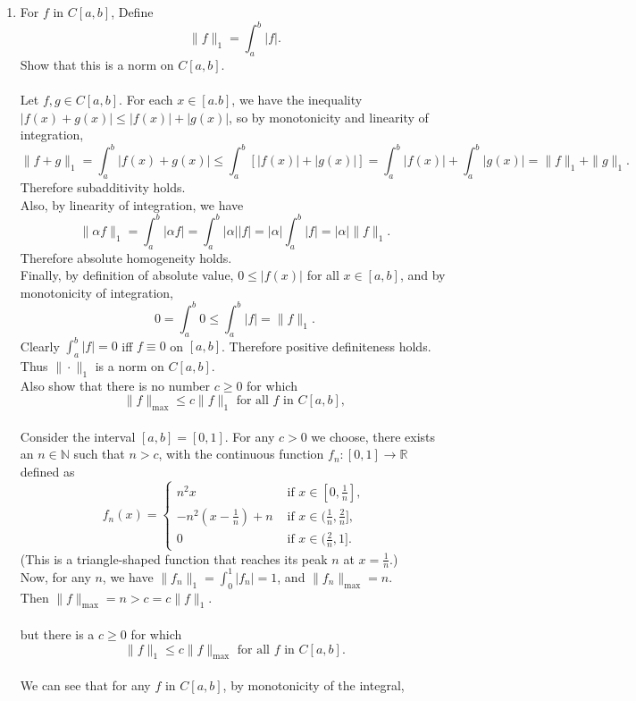 \begin{enumerate}
	\setcounter{enumi}{0}
	\item For $f$ in $C[a,b]$, Define
	\[
	\| f \|_1 = \int_a^b |f|.	
	\]
	Show that this is a norm on $C[a,b]$.\\\\
	Let $f,g\in C[a,b]$. For each $x\in [a.b]$, we have the inequality $|f(x)+g(x)|\le|f(x)|+|g(x)|$, so by monotonicity and linearity of integration,
	\[
	\|f+g\|_1=\int_a^b|f(x)+g(x)| \le \int_a^b[|f(x)|+|g(x)|] = \int_a^b|f(x)| +\int_a^b|g(x)| = \|f\|_1+\|g\|_1.	
	\]
	Therefore subadditivity holds.\\
	Also, by linearity of integration, we have
	\[
	\|\alpha f\|_1 = \int_a^b|\alpha f| = \int_a^b|\alpha| |f|=|\alpha|\int_a^b| f| = |\alpha|\|f\|_1.	
	\]
	Therefore absolute homogeneity holds.\\
	Finally, by definition of absolute value, $0 \le |f(x)|$ for all $x\in [a,b]$, and by monotonicity of integration,
	\[
	0=\int_a^b 0 \le \int_a^b |f| = \|f\|_1.	
	\] 
	Clearly $\int_a^b |f| = 0$ iff $f\equiv 0$ on $[a,b]$.
	Therefore positive definiteness holds.\\
	Thus $\|\cdot\|_1$ is a norm on $C[a,b]$.\\
	Also show that there is no number $c \ge 0$ for which
	\[
	\| f \|_{\max}	\le c \| f \|_1 \text{ for all $f$ in $C[a,b]$},
	\]
	\\
	Consider the interval $[a,b]=[0,1]$.
	For any $c>0$ we choose, there exists an $n\in \mathbb{N}$ such that $n> c$, with the continuous function $f_n:[0,1]\to \mathbb{R}$ defined as
	\[ 
		f_n(x) =
		\begin{cases} 
			n^2x& \text{ if } x \in [0,\frac{1}{n}], \\
			-n^2(x-\frac{1}{n})+n & \text{ if } x \in (\frac{1}{n},\frac{2}{n}],\\
			0& \text{ if } x \in (\frac{2}{n},1].
		\end{cases}
	\]
	(This is a triangle-shaped function that reaches its peak $n$ at $x=\frac{1}{n}$.)\\
	Now, for any $n$, we have $\|f_n\|_1 = \int_0^1|f_n|=1$, and $\|f_n\|_{\max} = n$.\\
	Then $\| f \|_{\max}=n > c =  c \| f \|_1$.\\
	\\
	but there is a $c \ge 0$ for which 
	\[
	\| f \|_1	\le c \| f \|_{\max} \text{ for all $f$ in $C[a,b]$}.
	\]
	\\
	We can see that for any $f$ in $C[a,b]$, by monotonicity of the integral, 

\end{enumerate}

